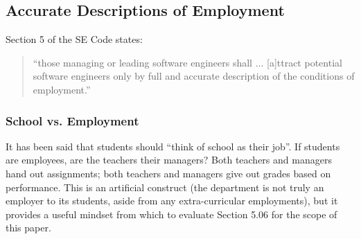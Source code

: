 \documentclass[11pt]{article}
\begin{document}
\begin{multicols}{2}
%
%
%
%
%
%

\subsection{Accurate Descriptions of Employment}

Section 5 of the SE Code states:

\begin{quote}
``those managing or leading software engineers shall ... [a]ttract potential software engineers only by full and accurate description of the conditions of employment.'' \cite{secode}
\end{quote}

\subsubsection{School vs. Employment}

It has been said that students should ``think of school as their job''. \cite{schoolJob}  If students are employees, are the teachers their managers?  Both teachers and managers hand out assignments; both teachers and managers give out grades based on performance. \cite{performanceReview}  This is an artificial construct (the department is not truly an employer to its students, aside from any extra-curricular employments), but it provides a useful mindset from which to evaluate Section 5.06 for the scope of this paper.


\end{multicols}
\end{document}
